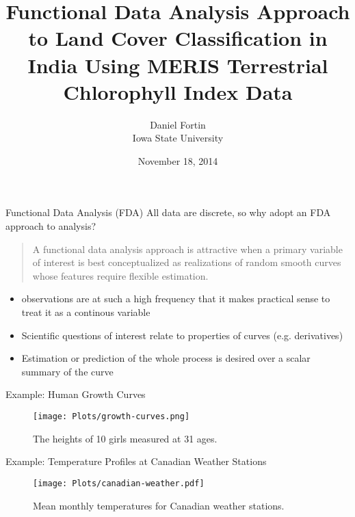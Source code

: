 \documentclass{beamer}
\title{Functional Data Analysis Approach to Land Cover Classification in India Using MERIS Terrestrial Chlorophyll Index Data}
\author{Daniel Fortin \\[0.5cm]
Iowa State University}
\date{November 18, 2014}
\begin{document}
\frame{\titlepage}


\begin{frame}[t]{Functional Data Analysis (FDA)}
	All data are discrete, so why adopt an FDA approach to analysis?
	
	\begin{quote}
 A functional data analysis approach is attractive when a primary variable of interest is best conceptualized as realizations of random smooth curves whose features require flexible estimation.
	\end{quote}
	\begin{itemize}
		\item observations are at such a high frequency that it makes practical sense to treat it as a continous variable
		\item Scientific questions of interest relate to properties of curves (e.g. derivatives)
		\item Estimation or prediction of the whole process is desired over a scalar summary of the curve
	\end{itemize}
\end{frame}
\begin{frame}[t]{Example: Human Growth Curves}
	\begin{figure}
	\begin{center}
	\texttt{[image: Plots/growth-curves.png]}
	\caption{ The heights of 10 girls measured at 31 ages.}
	\end{center}
	\end{figure}
\end{frame}

\begin{frame}[t]{Example: Temperature Profiles at Canadian Weather Stations}
	\begin{figure}
	\begin{center}
	\texttt{[image: Plots/canadian-weather.pdf]}
	\caption{ Mean monthly temperatures for Canadian weather stations.}
	\end{center}
	\end{figure}
\end{frame}


\end{document}
